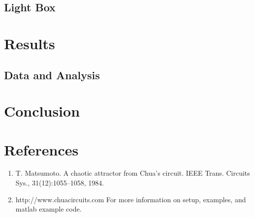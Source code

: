 \documentclass[12pt]{article}
\begin{document}
        \subsection{Light Box}


\section{Results}
        \subsection{Data and Analysis}



\section{Conclusion}


\section{References}
    \begin{enumerate}
        \sloppy
        \item  T. Matsumoto. A chaotic attractor from Chua’s circuit. IEEE Trans. Circuits Sys., 31(12):1055–1058, 1984.
        \item  http://www.chuacircuits.com For more information on setup, examples, and matlab example code.

    \end{enumerate}
\end{document}
